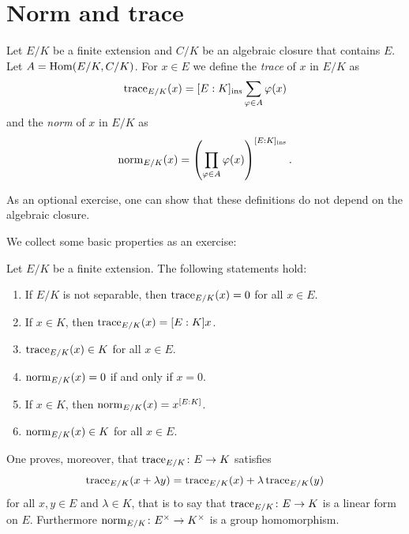 
\section{Norm and trace}

\begin{definition}
    Let $E/K$ be a finite extension and $C/K$ be an algebraic closure 
    that contains $E$. Let $A=\operatorname{Hom}(E/K,C/K)$. For $x\in E$
    we define the \emph{trace} of $x$ in $E/K$ 
    as 
    \[
    \operatorname{trace}_{E/K}(x)=[E:K]_{\operatorname{ins}}\sum_{\varphi\in A}\varphi(x)
    \]
    and the \emph{norm} of $x$ in $E/K$ as
    \[
    \operatorname{norm}_{E/K}(x)=\left(\prod_{\varphi\in A}\varphi(x)\right)^{[E:K]_{\operatorname{ins}}}.
    \]
\end{definition}

As an optional exercise, one can show that these definitions do not depend on the algebraic closure. 

We collect some basic properties as an exercise:

\begin{exercise}
\label{xca:norm_and_trace}
    Let $E/K$ be a finite extension. The following statements hold:
    \begin{enumerate}
        \item If $E/K$ is not separable, then $\operatorname{trace}_{E/K}(x)=0$ for all $x\in E$.
        \item If $x\in K$, then $\operatorname{trace}_{E/K}(x)=[E:K]x$.
        \item $\operatorname{trace}_{E/K}(x)\in K$ for all $x\in E$.
        \item $\operatorname{norm}_{E/K}(x)=0$ if and only if $x=0$. 
        \item If $x\in K$, then $\operatorname{norm}_{E/K}(x)=x^{[E:K]}$. 
        \item $\operatorname{norm}_{E/K}(x)\in K$ for all $x\in E$. 
    \end{enumerate}
\end{exercise}

One proves, moreover, that  
$\operatorname{trace}_{E/K}\colon E\to K$ 
satisfies
\[
\operatorname{trace}_{E/K}(x+\lambda y)=
\operatorname{trace}_{E/K}(x)+\lambda\operatorname{trace}_{E/K}(y)
\]
for all $x,y\in E$ and $\lambda\in K$, that is to say that 
$\operatorname{trace}_{E/K}\colon E\to K$ 
is a 
linear form on $E$. Furthermore 
$\operatorname{norm}_{E/K}\colon E^{\times}\to K^{\times}$ 
is a group homomorphism. 

